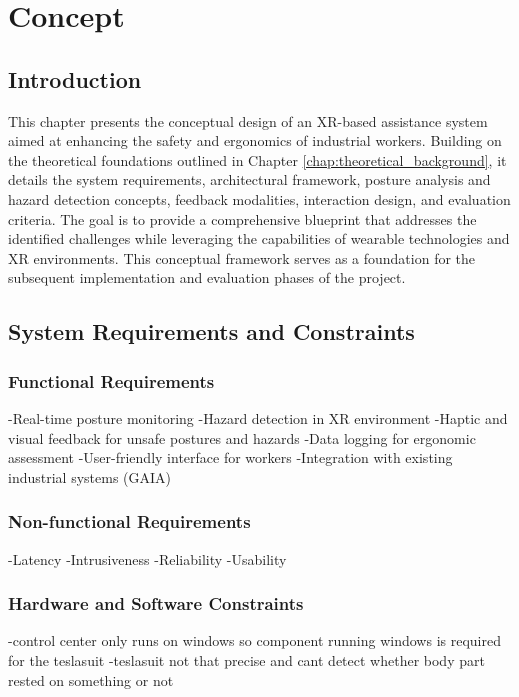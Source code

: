 \chapter{Concept}
\label{chap:concept}

\section{Introduction}
This chapter presents the conceptual design of an XR-based assistance system aimed at enhancing the safety and ergonomics of industrial workers. Building on the theoretical foundations outlined in Chapter \ref{chap:theoretical_background}, it details the system requirements, architectural framework, posture analysis and hazard detection concepts, feedback modalities, interaction design, and evaluation criteria. The goal is to provide a comprehensive blueprint that addresses the identified challenges while leveraging the capabilities of wearable technologies and XR environments. This conceptual framework serves as a foundation for the subsequent implementation and evaluation phases of the project.

\section{System Requirements and Constraints}

\subsection{Functional Requirements}
-Real-time posture monitoring
-Hazard detection in XR environment
-Haptic and visual feedback for unsafe postures and hazards
-Data logging for ergonomic assessment
-User-friendly interface for workers
-Integration with existing industrial systems (GAIA)

\subsection{Non-functional Requirements}
-Latency 
-Intrusiveness
-Reliability
-Usability
\subsection{Hardware and Software Constraints}
-control center only runs on windows so component running windows is required for the teslasuit
-teslasuit not that precise and cant detect whether body part rested on something or not

